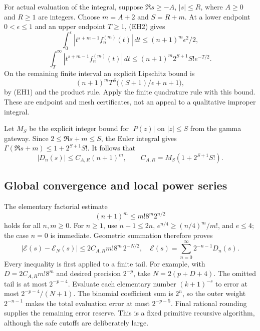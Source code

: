 For actual evaluation of the integral, suppose
$\Re s\ge-A$, $|s|\le R$, where $A\ge0$ and $R\ge1$ are integers.
Choose $m=A+2$ and $S=R+m$.  At a lower endpoint $0<\epsilon\le1$
and an upper endpoint $T\ge1$, (EH2) gives
\[
 \int_0^\epsilon|t^{s+m-1}f_n^{(m)}(t)|\,dt
       \le(n+1)^m\epsilon^2/2,
\]
\[
 \int_T^\infty|t^{s+m-1}f_n^{(m)}(t)|\,dt
       \le(n+1)^m2^{S+1}S!e^{-T/2}.                 \tag{EH3}
\]
On the remaining finite interval an explicit Lipschitz bound is
\[
 (n+1)^mT^S\bigl((S+1)/\epsilon+n+1\bigr),
\]
by (EH1) and the product rule.  Apply the finite quadrature rule with
this bound.  These are endpoint and mesh certificates, not an appeal
to a qualitative improper integral.

Let $M_S$ be the explicit integer bound for $|P(z)|$ on $|z|\le S$
from the gamma gateway.  Since $2\le\Re s+m\le S$, the Euler
integral gives $\Gamma(\Re s+m)\le1+2^{S+1}S!$.  It follows that
\begin{equation}
 |D_n(s)|\le C_{A,R}(n+1)^m,
 \qquad C_{A,R}=M_S(1+2^{S+1}S!).
 \label{eq:hasse-polynomial-bound}
\end{equation}

\subsection{Global convergence and local power series}

The elementary factorial estimate
\[
 (n+1)^m\le m!8^m2^{n/2}
\]
holds for all $n,m\ge0$.  For $n\ge1$, use $n+1\le2n$,
$e^{n/4}\ge(n/4)^m/m!$, and $e\le4$; the case $n=0$ is immediate.
Geometric summation therefore proves
\begin{equation}
 \boxed{\displaystyle
 |\mathcal{E}(s)-\mathcal{E}_N(s)|\le 2C_{A,R}m!8^m\,2^{-N/2},
 \quad \mathcal{E}(s)=\sum_{n=0}^{\infty}2^{-n-1}D_n(s).}
 \label{eq:hasse-tail}
\end{equation}
Every inequality is first applied to a finite tail.  For example,
with $D=2C_{A,R}m!8^m$ and desired precision $2^{-p}$, take
$N=2(p+D+4)$.  The omitted tail is at most $2^{-p-4}$.
Evaluate each elementary number $(k+1)^{-s}$ to error at most
$2^{-p-4}/(N+1)$.  The binomial coefficient sum is $2^n$, so the
outer weight $2^{-n-1}$ makes the total evaluation error at most
$2^{-p-5}$.  Final rational rounding supplies the remaining error
reserve.  This is a fixed primitive recursive algorithm, although the
safe cutoffs are deliberately large.

